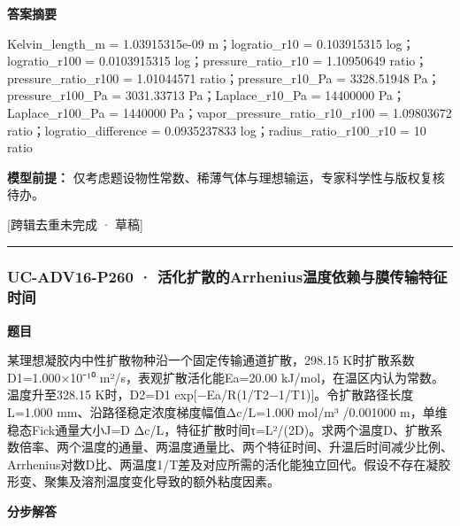 \documentclass[UTF8,11pt,a4paper]{ctexart}
\begin{document}
\noindent\textbf{答案摘要}\par
Kelvin\_length\_m = 1.03915315e-09 m；logratio\_r10 = 0.103915315 log；logratio\_r100 = 0.0103915315 log；pressure\_ratio\_r10 = 1.10950649 ratio；pressure\_ratio\_r100 = 1.01044571 ratio；pressure\_r10\_Pa = 3328.51948 Pa；pressure\_r100\_Pa = 3031.33713 Pa；Laplace\_r10\_Pa = 14400000 Pa；Laplace\_r100\_Pa = 1440000 Pa；vapor\_pressure\_ratio\_r10\_r100 = 1.09803672 ratio；logratio\_difference = 0.0935237833 log；radius\_ratio\_r100\_r10 = 10 ratio\par
\noindent\textbf{模型前提：}
仅考虑题设物性常数、稀薄气体与理想输运，专家科学性与版权复核待办。\par
\noindent\textcolor{red!65!black}{[跨辑去重未完成 · 草稿]} \par
\medskip\hrule\medskip
{}
\subsubsection*{UC-ADV16-P260 · 活化扩散的Arrhenius温度依赖与膜传输特征时间}
\noindent\textbf{题目}\par
某理想凝胶内中性扩散物种沿一个固定传输通道扩散，298.15 K时扩散系数D1=1.000×10⁻¹⁰ m²/s，表观扩散活化能Ea=20.00 kJ/mol，在温区内认为常数。温度升至328.15 K时，D2=D1 exp[−Ea/R(1/T2−1/T1)]。令扩散路径长度L=1.000 mm、沿路径稳定浓度梯度幅值Δc/L=1.000 mol/m³ /0.001000 m，单维稳态Fick通量大小J=D Δc/L，特征扩散时间τ=L²/(2D)。求两个温度D、扩散系数倍率、两个温度的通量、两温度通量比、两个特征时间、升温后时间减少比例、Arrhenius对数D比、两温度1/T差及对应所需的活化能独立回代。假设不存在凝胶形变、聚集及溶剂温度变化导致的额外粘度因素。\par
\medskip\noindent\textbf{分步解答}
\end{document}
